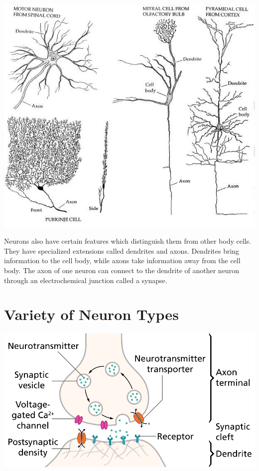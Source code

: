\documentclass[11pt]{article}
\begin{document}
\includegraphics[width=\textwidth,height=\textheight,keepaspectratio]{images/img_6}

Neurons also have certain features which distinguish them from other body cells.
They have specialized extensions called dendrites and axons.
Dendrites bring information to the cell body, while axons take information away from the cell body.
The axon of one neuron can connect to the dendrite of another neuron through an electrochemical junction called a synapse.

\section{Variety of Neuron Types}\label{sec:variety-of-neuron-types}
\includegraphics[width=\textwidth,height=\textheight,keepaspectratio]{images/img_7}
\end{document}
